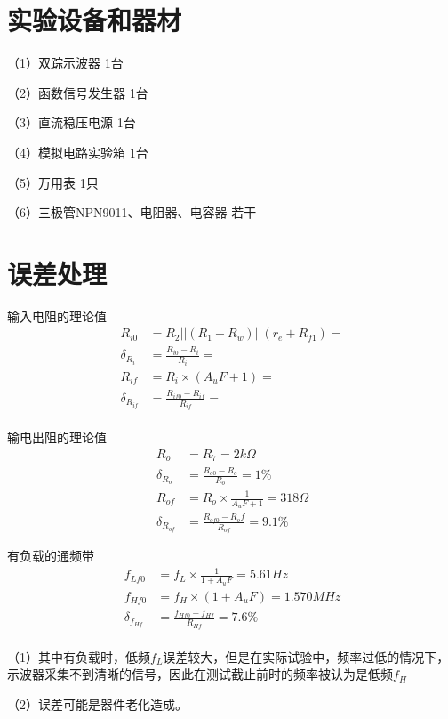\documentclass{article}
\begin{document}
	\section{ 实验设备和器材}
	（1）双踪示波器             \qquad \qquad \qquad \qquad \qquad  \qquad           1台\par
	（2）函数信号发生器          \qquad  \qquad \qquad \qquad       \qquad           1台\par
	（3）直流稳压电源             \qquad \quad \qquad \qquad \qquad \qquad           1台\par
	（4）模拟电路实验箱            \qquad  \qquad \qquad \qquad\qquad                1台\par
	（5）万用表                   \qquad  \qquad \qquad \qquad \qquad \qquad \qquad  1只\par
	（6）三极管NPN9011、电阻器、电容器  \qquad                                        若干
\section{误差处理}
输入电阻的理论值
\begin{align*}
	\ R_{i0}&=R_2||(R_1+R_w)||(r_e+R_{f1})=\\
	\ \delta_{R_i} &=\frac{R_{i0}-R_i}{R_{i}}=\\
	\ R_{if}&=R_i \times (A_uF+1)=\\
	\ \delta_{R_{if}} &=\frac{R_{if0}-R_{if}}{R_{if}}=\\
\end{align*}
\par
输电出阻的理论值
\begin{align*}
	\ R_o&=R_7=2k\Omega\\
	\ \delta_{R_o} &=\frac{R_{o0}-R_o}{R_{o}}=1\%\\
	\ R_{of}&=R_o\times \frac{1}{A_uF+1}=318\Omega\\
	\ \delta_{R_{of}} &=\frac{R_{of0}-R_of}{R_{of}}=9.1\%
\end{align*}
\par
有负载的通频带
\begin{align*}
	\ f_{Lf0}&=f_L\times\frac{1}{1+A_uF}=5.61Hz\\
	\ f_{Hf0}&=f_H\times(1+A_uF)=1.570MHz\\
	\ \delta_{f_{Hf}} &=\frac{f_{Hf0}-f_{Hf}}{R_{Hf}}=7.6\%\\
\end{align*}
\par 
（1）其中有负载时，低频$f_L$误差较大，但是在实际试验中，频率过低的情况下，示波器采集不到清晰的信号，因此在测试截止前时的频率被认为是低频$f_H$\par
（2）误差可能是器件老化造成。\par
\newpage
\end{document}

